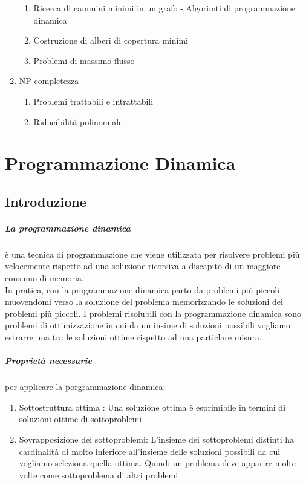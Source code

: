 \documentclass[12pt, a4paper, openany]{book}
\begin{document}
\begin{enumerate}
\begin{enumerate}
              \item Ricerca di cammini minimi in un grafo - Algorimti di programmazione dinamica
              \item Costruzione di alberi di copertura minimi
              \item Problemi di massimo flusso
          \end{enumerate}
    \item NP completezza
          \begin{enumerate}
              \item Problemi trattabili e intrattabili
              \item Riducibilità polinomiale
          \end{enumerate}

\end{enumerate}

\chapter{Programmazione Dinamica}
\section{Introduzione}
\paragraph{La programmazione dinamica} è una tecnica di programmazione che viene utilizzata per risolvere problemi più velocemente rispetto ad una soluzione ricorsiva a discapito di un maggiore consumo di memoria.
\\In pratica, con la programmazione dinamica parto da problemi più piccoli muovendomi verso la soluzione del problema memorizzando le soluzioni dei problemi più piccoli.
I problemi risolubili con la programmazione dinamica sono problemi di ottimizzazione in cui da un insime di soluzioni possibili vogliamo estrarre una tra le soluzioni ottime rispetto ad una particlare misura.
\paragraph{Proprietà necessarie} per applicare la porgrammazione dinamica:
\begin{enumerate}
    \item Sottostruttura ottima : Una soluzione ottima è esprimibile in termini di soluzioni ottime di sottoproblemi
    \item Sovrapposizione dei sottoproblemi: L'insieme dei sottoproblemi distinti ha cardinalità di molto inferiore all'insieme delle soluzioni possibili da cui vogliamo seleziona quella ottima. Quindi un problema deve apparire molte volte come sottoproblema di altri problemi
\end{enumerate}
\end{document}
